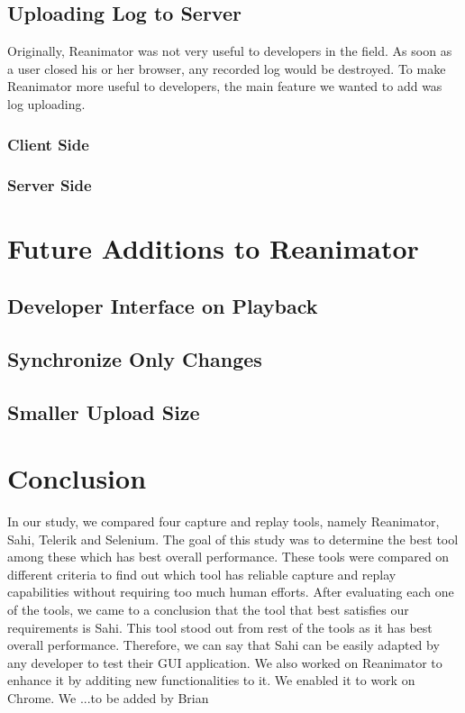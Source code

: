 \documentclass[12pt,journal]{IEEEtran}
\begin{document}
\subsection{Uploading Log to Server}
Originally, Reanimator was not very useful to developers in the field. As soon as a user closed his or her browser, any recorded log would be destroyed. To make Reanimator more useful to developers, the main feature we wanted to add was log uploading.

\subsubsection{Client Side}

\subsubsection{Server Side}

\section{Future Additions to Reanimator}

\subsection{Developer Interface on Playback}

\subsection{Synchronize Only Changes}

\subsection{Smaller Upload Size}


\section{Conclusion}
In our study, we compared four capture and replay tools, namely Reanimator, Sahi, Telerik and Selenium. The goal of this study was to determine the best tool among these which has best overall performance. These tools were compared on different criteria to find out which tool has reliable capture and replay capabilities without requiring too much human efforts. After evaluating each one of the tools, we came to a conclusion that the tool that best satisfies our requirements is Sahi. This tool stood out from rest of the tools as it has best overall performance. Therefore, we can say that Sahi can be easily adapted by any developer to test their GUI application. We also worked on Reanimator to enhance it by additing new functionalities to it. We enabled it to work on Chrome. We ...{to be added by Brian}




\printbibliography
\end{document}
